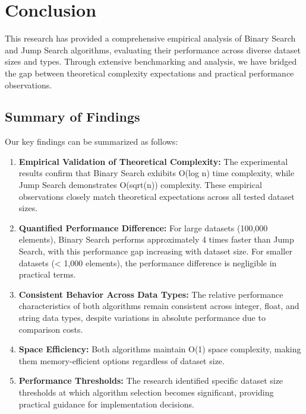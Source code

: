 \chapter{Conclusion}

This research has provided a comprehensive empirical analysis of Binary Search and Jump Search algorithms, evaluating their performance across diverse dataset sizes and types. Through extensive benchmarking and analysis, we have bridged the gap between theoretical complexity expectations and practical performance observations.

\section{Summary of Findings}

Our key findings can be summarized as follows:

\begin{enumerate}
    \item \textbf{Empirical Validation of Theoretical Complexity:} The experimental results confirm that Binary Search exhibits O(log n) time complexity, while Jump Search demonstrates O(sqrt(n)) complexity. These empirical observations closely match theoretical expectations across all tested dataset sizes.
    
    \item \textbf{Quantified Performance Difference:} For large datasets (100,000 elements), Binary Search performs approximately 4 times faster than Jump Search, with this performance gap increasing with dataset size. For smaller datasets (< 1,000 elements), the performance difference is negligible in practical terms.
    
    \item \textbf{Consistent Behavior Across Data Types:} The relative performance characteristics of both algorithms remain consistent across integer, float, and string data types, despite variations in absolute performance due to comparison costs.
    
    \item \textbf{Space Efficiency:} Both algorithms maintain O(1) space complexity, making them memory-efficient options regardless of dataset size.
    
    \item \textbf{Performance Thresholds:} The research identified specific dataset size thresholds at which algorithm selection becomes significant, providing practical guidance for implementation decisions.
\end{enumerate}

